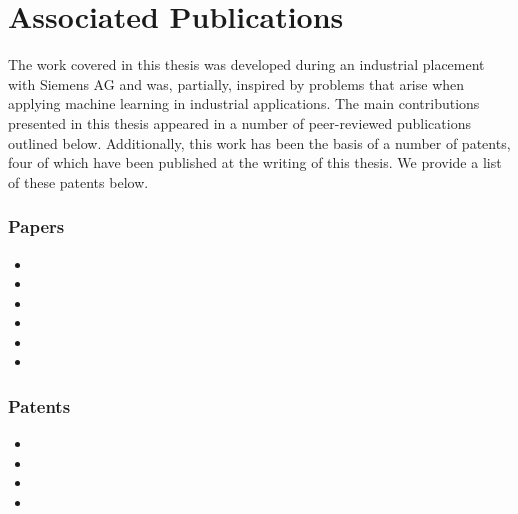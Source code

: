 \section{Associated Publications}
The work covered in this thesis was developed during an industrial placement with Siemens AG and was, partially, inspired by problems that arise when applying machine learning in industrial applications.
The main contributions presented in this thesis appeared in a number of peer-reviewed publications outlined below.
Additionally, this work has been the basis of a number of patents, four of which have been published at the writing of this thesis.
We provide a list of these patents below.

\subsubsection{Papers}
\begin{itemize}
    \item {}

    \item {}

    \item {}

    \item {}

    \item {}

    \item {}

\end{itemize}

\subsubsection{Patents}
\begin{itemize}
    \item {}
    \item {}
    \item {}
    \item {}
\end{itemize}
